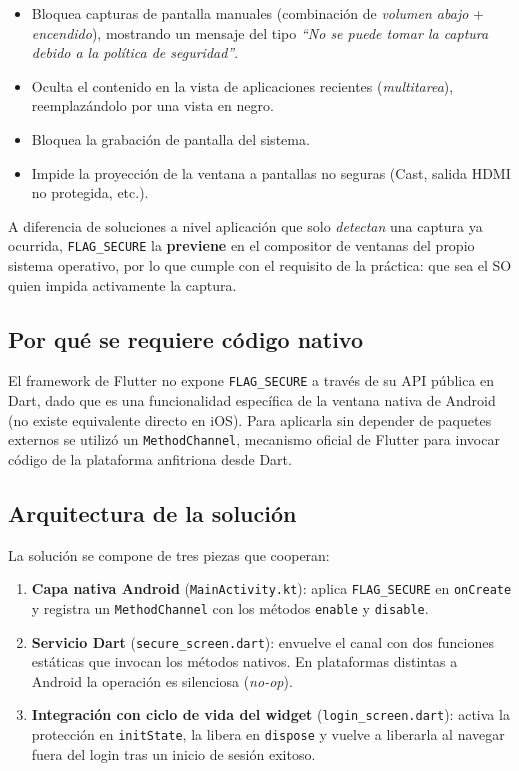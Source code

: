 \documentclass[12pt, a4paper]{article}
\begin{document}
\begin{itemize}
    \item Bloquea capturas de pantalla manuales (combinación de
    \textit{volumen abajo} + \textit{encendido}), mostrando un mensaje del
    tipo \textit{``No se puede tomar la captura debido a la política de
    seguridad''}.
    \item Oculta el contenido en la vista de aplicaciones recientes
    (\textit{multitarea}), reemplazándolo por una vista en negro.
    \item Bloquea la grabación de pantalla del sistema.
    \item Impide la proyección de la ventana a pantallas no seguras
    (Cast, salida HDMI no protegida, etc.).
\end{itemize}

A diferencia de soluciones a nivel aplicación que solo \textit{detectan}
una captura ya ocurrida, \texttt{FLAG\_SECURE} la \textbf{previene} en el
compositor de ventanas del propio sistema operativo, por lo que cumple
con el requisito de la práctica: que sea el SO quien impida activamente
la captura.

\subsection{Por qué se requiere código nativo}
El framework de Flutter no expone \texttt{FLAG\_SECURE} a través de su API
pública en Dart, dado que es una funcionalidad específica de la ventana
nativa de Android (no existe equivalente directo en iOS). Para aplicarla
sin depender de paquetes externos se utilizó un \texttt{MethodChannel},
mecanismo oficial de Flutter para invocar código de la plataforma anfitriona
desde Dart.

\subsection{Arquitectura de la solución}
La solución se compone de tres piezas que cooperan:

\begin{enumerate}
    \item \textbf{Capa nativa Android} (\texttt{MainActivity.kt}):
    aplica \texttt{FLAG\_SECURE} en \texttt{onCreate} y registra un
    \texttt{MethodChannel} con los métodos \texttt{enable} y \texttt{disable}.
    \item \textbf{Servicio Dart} (\texttt{secure\_screen.dart}):
    envuelve el canal con dos funciones estáticas que invocan los
    métodos nativos. En plataformas distintas a Android la operación es
    silenciosa (\textit{no-op}).
    \item \textbf{Integración con ciclo de vida del widget}
    (\texttt{login\_screen.dart}): activa la protección en
    \texttt{initState}, la libera en \texttt{dispose} y vuelve a liberarla
    al navegar fuera del login tras un inicio de sesión exitoso.
\end{enumerate}
\end{document}
